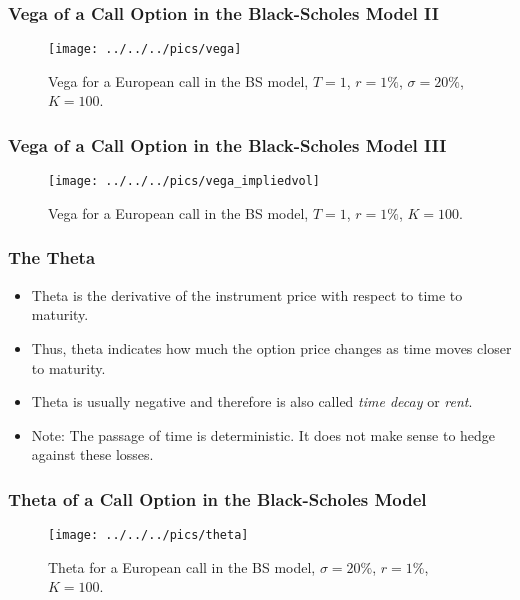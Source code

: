 \begin{frame}[fragile]
\frametitle{Vega of a Call Option in the Black-Scholes Model II}
\begin{figure}[htp]
\begin{center}
  \texttt{[image: ../../../pics/vega]}
  \caption{Vega for a European call in the BS model, $T=1$, $r=1\%$,
  $\sigma=20\%$, $K=100$.}
  \label{fig:vegaBS}
\end{center}
\end{figure}
\end{frame}

\begin{frame}[fragile]
\frametitle{Vega of a Call Option in the Black-Scholes Model III}
\begin{figure}[htp]
\begin{center}
  \texttt{[image: ../../../pics/vega\_impliedvol]}
  \caption{Vega for a European call in the BS model, $T=1$, $r=1\%$, $K=100$.}
  \label{fig:vega2BS}
\end{center}
\end{figure}
\end{frame}

\begin{frame}[fragile]
\frametitle{The Theta}
\begin{itemize}
  \item Theta is the derivative of the instrument price with respect to
  time to maturity.
  \item Thus, theta indicates how much the option price changes as time moves
  closer to maturity.
  \item Theta is usually negative and therefore is also called \emph{time decay}
  or \emph{rent}.
  \item Note: The passage of time is deterministic. It does not make sense to
  hedge against these losses. 
\end{itemize}
\end{frame}

\begin{frame}[fragile]
\frametitle{Theta of a Call Option in the Black-Scholes Model}
\begin{figure}[htp]
\begin{center}
  \texttt{[image: ../../../pics/theta]}
  \caption{Theta for a European call in the BS model, $\sigma=20\%$, $r=1\%$,
  $K=100$.}
  \label{fig:thetaBS}
\end{center}
\end{figure}
\end{frame}


